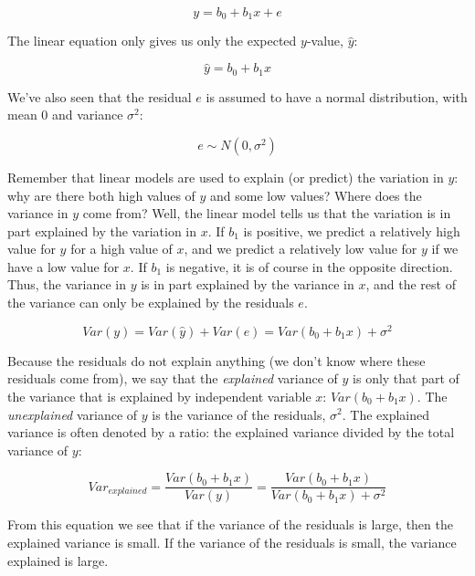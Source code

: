 \documentclass[]{book}\usepackage[]{graphicx}\usepackage[]{color}
\begin{document}
\begin{equation}
y = b_0 + b_1 x + e
\end{equation}

The linear equation only gives us only the expected $y$-value, $\hat{y}$:


\begin{equation}
\hat{y} = b_0 + b_1 x
\end{equation}


We've also seen that the residual $e$ is assumed to have a normal distribution, with mean 0 and variance $\sigma^2$:


\begin{equation}
e \sim N(0,\sigma^2)
\end{equation}

Remember that linear models are used to explain (or predict) the variation in $y$: why are there both high values of $y$ and some low values? Where does the variance in $y$ come from? Well, the linear model tells us that the variation is in part explained by the variation in $x$. If $b_1$ is positive, we predict a relatively high value for $y$ for a high value of $x$, and we predict a relatively low value for $y$ if we have a low value for $x$. If $b_1$ is negative, it is of course in the opposite direction. Thus, the variance in $y$ is in part explained by the variance in $x$, and the rest of the variance can only be explained by the residuals $e$.



\begin{equation}
Var(y) = Var(\hat{y}) + Var(e) = Var(b_0 + b_1 x) + \sigma^2
\end{equation}


Because the residuals do not explain anything (we don't know where these residuals come from), we say that the \textit{explained} variance of $y$ is only that part of the variance that is explained by independent variable $x$: $Var(b_0 + b_1 x)$. The \textit{unexplained} variance of $y$ is the variance of the residuals, $\sigma^2$. The explained variance is often denoted by a ratio: the explained variance divided by the total variance of $y$:


\begin{equation}
Var_{explained} = \frac{Var(b_0+b_1 x)}{Var(y)} = \frac{Var(b_0+b_1 x)}{Var(b_0+b_1 x) + \sigma^2}
\end{equation}

From this equation we see that if the variance of the residuals is large, then the explained variance is small. If the variance of the residuals is small, the variance explained is large.
\end{document}
